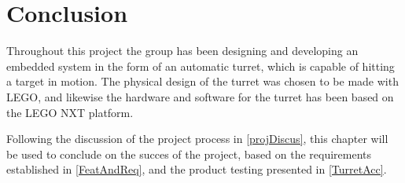 \chapter{Conclusion}\label{FinalConclusion}
Throughout this project the group has been designing and developing an embedded
system in the form of an automatic turret, which is capable of hitting a target
in motion. The physical design of the turret was chosen to be made with LEGO,
and likewise the hardware and software for the turret has been based on the LEGO
NXT platform.\nl

Following the discussion of the project process in \autoref{projDiscus}, this
chapter will be used to conclude on the succes of the project, based on the
requirements established in \autoref{FeatAndReq}, and the product testing
presented in \autoref{TurretAcc}. 
